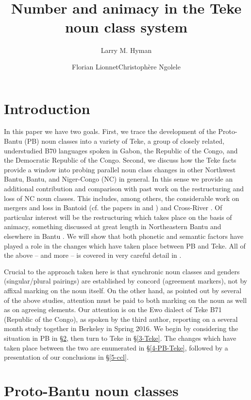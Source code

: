 \documentclass[output=paper,,modfonts,nonflat]{langsci/langscibook}
\title{Number and animacy in the Teke noun class system}
\author{Larry M. Hyman\affiliation{University of California, Berkeley}\and  Florian Lionnet\affiliation{Princeton University}\lastand  Christophère Ngolele\affiliation{Université Catholique d'Afrique Centrale, Yaoundé}}
\begin{document}
\maketitle
\section{Introduction} 
\label{intro}

In this paper we have two goals. First, we trace the development of the Proto-Bantu (PB) noun classes into a variety of Teke, a group of closely related, understudied B70 languages spoken in Gabon, the Republic of the Congo, and the Democratic Republic of the Congo. Second, we discuss how the Teke facts provide a window into probing parallel noun class changes in other Northwest Bantu, Bantu, and Niger-Congo (NC) in general. In this sense we provide an additional contribution and comparison with past work on the restructuring and loss of NC noun classes. This includes, among others, the considerable work on mergers and loss in Bantoid (cf. the papers in \citealt{Hyman1980}  and \citealt{hymanvoorhoeve1980}) and Cross-River \citep{Williamson1985,Faraclas1986,Connell1987,hymanudoh2006}. Of particular interest will be the restructuring which takes place on the basis of animacy, something discussed at great length in Northeastern Bantu \citep{Wald1975,Contini2008} and elsewhere in Bantu \citep[122--126]{Maho1999}. We will show that both phonetic and semantic factors have played a role in the changes which have taken place between PB and Teke. All of the above -- and more -- is covered in very careful detail in \citet{Good2012}.

Crucial to the approach taken here is that synchronic noun classes and genders (singular/plural pairings) are established by concord (agreement markers), not by affixal marking on the noun itself. On the other hand, as pointed out by several of the above studies, attention must be paid to both marking on the noun as well as on agreeing elements. Our attention is on the Ewo dialect of Teke B71 (Republic of the Congo), as spoken by the third author, reporting on a several month study together in Berkeley in Spring 2016. We begin by considering the situation in PB in \S\ref{2-PB}, then turn to Teke in \S\ref{3-Teke}. The changes which have taken place between the two are enumerated in \S\ref{4-PB-Teke}, followed by a presentation of our conclusions in \S\ref{5-ccl}.


\section{Proto-Bantu noun classes} 
\label{2-PB}
\end{document}
